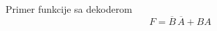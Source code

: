\begin{frame}[label=03-s006]{Primer funkcije sa dekoderom}
\[F=\overline B\,\overline A+BA\]
\begin{center}\end{center}
\end{frame}
